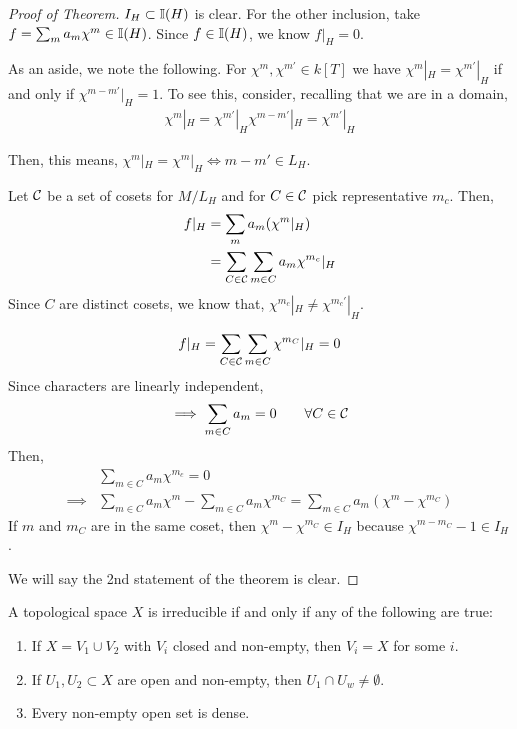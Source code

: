 \documentclass[12pt]{amsart}
\begin{document}
\begin{proof}[Proof of Theorem]
    $I_H \subset \mathbb I(H)$ is clear. For the other inclusion, take $f = \sum_{m} a_m\chi^m \in \mathbb I(H)$. Since $f \in \mathbb I(H)$, we know $f|_H = 0$. 

    As an aside, we note the following. For $\chi^m, \chi^{m'} \in k[T]$ we have $\chi^m|_H = \chi^{m'}|_H$ if and only if $\chi^{m-m'}|_H = 1$. To see this, consider, recalling that we are in a domain,
    \begin{align*}
        \chi^m|_H = \chi^{m'}|_H\chi^{m-m'}|_H = \chi^{m'}|_H
    \end{align*}
    
    Then, this means, $\chi^{m}|_H = \chi^m|_H \iff m-m' \in L_H$. 

    Let $\mathcal{C}$ be a set of cosets for $M/L_H$ and for $C \in \mathcal{C}$ pick representative $m_c$. Then, 
    \begin{align*}
        f|_H &= \sum_m a_m(\chi^m|_H) \\ 
             &= \sum_{C \in \mathcal{C}} \sum_{m \in C} a_m \chi^{m_c}|_H
    \end{align*}
    Since $C$ are distinct cosets, we know that, $\chi^{m_c}|_H \neq \chi^{m_c'}|_H$. 

    \begin{align*}
        f|_H = \sum_{C \in \mathcal{C}} \sum_{m \in C} \chi^{m_C}|_H = 0
    \end{align*}
    Since characters are linearly independent, 
    \[ \implies \sum_{m \in C} a_m = 0 \qquad \forall C \in \mathcal{C}\]
    Then, 
    \begin{align*}
        &\sum_{m \in C} a_m\chi^{m_c} = 0  \\
        \implies& \sum_{m \in C}a_m\chi^m - \sum_{m\in C}a_m\chi^{m_C} = \sum_{m\in C} a_m(\chi^m-\chi^{m_C})
    \end{align*}
    If $m$ and $m_C$ are in the same coset, then $\chi^{m} - \chi^{m_C} \in I_H$ because $\chi^{m-m_C}-1 \in I_H$. 

    We will say the 2nd statement of the theorem is clear.
\end{proof}

\begin{definition}
    A topological space $X$ is irreducible if and only if any of the following are true: 
    \begin{enumerate}
        \item If $X = V_1 \cup V_2$ with $V_i$ closed and non-empty, then $V_i = X$ for some $i$. 
        \item If $U_1, U_2 \subset X$ are open and non-empty, then $U_1 \cap U_w \neq \emptyset$. 
        \item Every non-empty open set is dense. 
    \end{enumerate}    
\end{definition}
\end{document}
